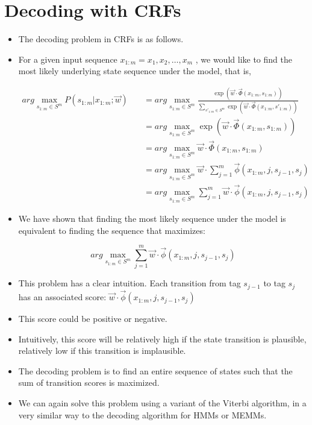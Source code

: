 \section{Decoding with CRFs}

\begin{itemize}
\item The decoding problem in CRFs is as follows.
\item For a given input sequence $x_{1:m} = x_1 , x_2 , \dots, x_m$ , we would like to find the most likely underlying  state sequence under the model, that is,

\begin{equation}
 \begin{split}
 arg \max_{s_{1:m} \in S^m} P(s_{1:m}| x_{1:m}; \vec{w})  \quad & =  arg \max_{s_{1:m} \in S^m} \frac{\exp (\vec{w} \cdot \vec{\Phi}(x_{1:m},s_{1:m}))}{\sum_{s'_{1:m} \in S^m}\exp (\vec{w} \cdot \vec{\Phi}(x_{1:m},s'_{1:m}))} \\
 \quad & =  arg \max_{s_{1:m} \in S^m} \exp (\vec{w} \cdot \vec{\Phi}(x_{1:m},s_{1:m})) \\
  \quad & =  arg \max_{s_{1:m} \in S^m}  \vec{w} \cdot \vec{\Phi}(x_{1:m},s_{1:m}) \\
    \quad & =  arg \max_{s_{1:m} \in S^m}  \vec{w} \cdot \sum_{j=1}^{m} \vec{\phi}(x_{1:m},j,s_{j-1},s_j) \\
 \quad & =  arg \max_{s_{1:m} \in S^m}  \sum_{j=1}^{m} \vec{w} \cdot \vec{\phi}(x_{1:m},j,s_{j-1},s_j)   
 \end{split}
 \end{equation}

\item We have shown that finding the most likely sequence under the model is equivalent to finding the sequence that maximizes:

\begin{displaymath}
 arg \max_{s_{1:m} \in S^m}  \sum_{j=1}^{m} \vec{w} \cdot \vec{\phi}(x_{1:m},j,s_{j-1},s_j)  
\end{displaymath}

\item This problem has a clear intuition. Each transition from tag  $s_{j-1}$ to tag $s_j$ has an associated score:  $\vec{w} \cdot \vec{\phi}(x_{1:m},j,s_{j-1},s_j)$  


\item This score could be positive or negative. 

\item Intuitively, this score will be relatively high if the state transition is plausible, relatively low if this transition is implausible.

\item  The decoding problem is to find an entire sequence of states such that the sum of transition scores is maximized.

\item We can again solve this problem using a variant of the Viterbi algorithm, in a very similar way to the decoding algorithm for HMMs or MEMMs.

\end{itemize}


